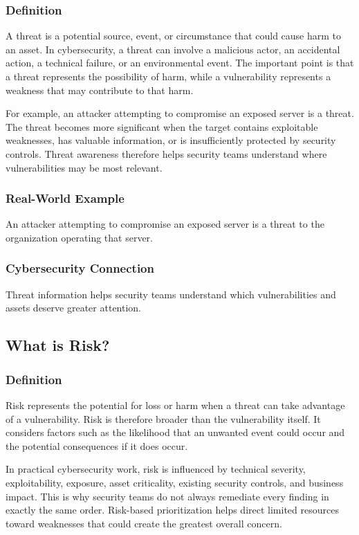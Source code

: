 \documentclass[11pt,a4paper]{article}
\begin{document}
\subsubsection{Definition}
A threat is a potential source, event, or circumstance that could cause harm to an asset. In cybersecurity, a threat can involve a malicious actor, an accidental action, a technical failure, or an environmental event. The important point is that a threat represents the possibility of harm, while a vulnerability represents a weakness that may contribute to that harm.

For example, an attacker attempting to compromise an exposed server is a threat. The threat becomes more significant when the target contains exploitable weaknesses, has valuable information, or is insufficiently protected by security controls. Threat awareness therefore helps security teams understand where vulnerabilities may be most relevant.

\subsubsection{Real-World Example}
An attacker attempting to compromise an exposed server is a threat to the organization operating that server.

\subsubsection{Cybersecurity Connection}
Threat information helps security teams understand which vulnerabilities and assets deserve greater attention.

\subsection{What is Risk?}
\subsubsection{Definition}
Risk represents the potential for loss or harm when a threat can take advantage of a vulnerability. Risk is therefore broader than the vulnerability itself. It considers factors such as the likelihood that an unwanted event could occur and the potential consequences if it does occur.

In practical cybersecurity work, risk is influenced by technical severity, exploitability, exposure, asset criticality, existing security controls, and business impact. This is why security teams do not always remediate every finding in exactly the same order. Risk-based prioritization helps direct limited resources toward weaknesses that could create the greatest overall concern.
\end{document}
